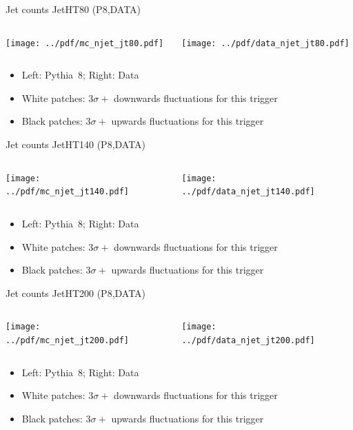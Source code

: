 \documentclass[9pt]{beamer}
\begin{document}
\begin{frame}[t]{Jet counts JetHT80 (P8,DATA)}
\begin{columns}[T]
  \begin{column}{.5\textwidth}
  \texttt{[image: ../pdf/mc\_njet\_jt80.pdf]}
  \end{column}
  \begin{column}{.5\textwidth}
  \texttt{[image: ../pdf/data\_njet\_jt80.pdf]}
  \end{column}
\end{columns}
\begin{itemize}
 \item Left: Pythia~8; Right: Data
 \item White patches: $3\sigma+$ downwards fluctuations for this trigger
 \item Black patches: $3\sigma+$ upwards fluctuations for this trigger
\end{itemize}
\end{frame}

\begin{frame}[t]{Jet counts JetHT140 (P8,DATA)}
\begin{columns}[T]
  \begin{column}{.5\textwidth}
  \texttt{[image: ../pdf/mc\_njet\_jt140.pdf]}
  \end{column}
  \begin{column}{.5\textwidth}
  \texttt{[image: ../pdf/data\_njet\_jt140.pdf]}
  \end{column}
\end{columns}
\begin{itemize}
 \item Left: Pythia~8; Right: Data
 \item White patches: $3\sigma+$ downwards fluctuations for this trigger
 \item Black patches: $3\sigma+$ upwards fluctuations for this trigger
\end{itemize}
\end{frame}

\begin{frame}[t]{Jet counts JetHT200 (P8,DATA)}
\begin{columns}[T]
  \begin{column}{.5\textwidth}
  \texttt{[image: ../pdf/mc\_njet\_jt200.pdf]}
  \end{column}
  \begin{column}{.5\textwidth}
  \texttt{[image: ../pdf/data\_njet\_jt200.pdf]}
  \end{column}
\end{columns}
\begin{itemize}
 \item Left: Pythia~8; Right: Data
 \item White patches: $3\sigma+$ downwards fluctuations for this trigger
 \item Black patches: $3\sigma+$ upwards fluctuations for this trigger
\end{itemize}
\end{frame}
\end{document}
